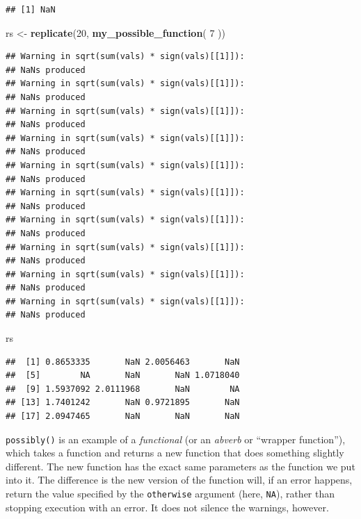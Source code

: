 \documentclass[
]{book}
\newenvironment{Shaded}{\begin{snugshade}}{\end{snugshade}}
\newcommand{\DecValTok}[1]{\textcolor[rgb]{0.00,0.00,0.81}{#1}}
\newcommand{\FunctionTok}[1]{\textcolor[rgb]{0.13,0.29,0.53}{\textbf{#1}}}
\newcommand{\NormalTok}[1]{#1}
\newcommand{\OtherTok}[1]{\textcolor[rgb]{0.56,0.35,0.01}{#1}}
\begin{document}
\begin{verbatim}
## [1] NaN
\end{verbatim}

\begin{Shaded}
\begin{Highlighting}[]
\NormalTok{rs }\OtherTok{\textless{}{-}} \FunctionTok{replicate}\NormalTok{(}\DecValTok{20}\NormalTok{, }\FunctionTok{my\_possible\_function}\NormalTok{( }\DecValTok{7}\NormalTok{ ))}
\end{Highlighting}
\end{Shaded}

\begin{verbatim}
## Warning in sqrt(sum(vals) * sign(vals)[[1]]):
## NaNs produced
## Warning in sqrt(sum(vals) * sign(vals)[[1]]):
## NaNs produced
## Warning in sqrt(sum(vals) * sign(vals)[[1]]):
## NaNs produced
## Warning in sqrt(sum(vals) * sign(vals)[[1]]):
## NaNs produced
## Warning in sqrt(sum(vals) * sign(vals)[[1]]):
## NaNs produced
## Warning in sqrt(sum(vals) * sign(vals)[[1]]):
## NaNs produced
## Warning in sqrt(sum(vals) * sign(vals)[[1]]):
## NaNs produced
## Warning in sqrt(sum(vals) * sign(vals)[[1]]):
## NaNs produced
## Warning in sqrt(sum(vals) * sign(vals)[[1]]):
## NaNs produced
## Warning in sqrt(sum(vals) * sign(vals)[[1]]):
## NaNs produced
\end{verbatim}

\begin{Shaded}
\begin{Highlighting}[]
\NormalTok{rs}
\end{Highlighting}
\end{Shaded}

\begin{verbatim}
##  [1] 0.8653335       NaN 2.0056463       NaN
##  [5]        NA       NaN       NaN 1.0718040
##  [9] 1.5937092 2.0111968       NaN        NA
## [13] 1.7401242       NaN 0.9721895       NaN
## [17] 2.0947465       NaN       NaN       NaN
\end{verbatim}

\texttt{possibly()} is an example of a \emph{functional} (or an \emph{abverb} or ``wrapper function''), which takes a function and returns a new function that does something slightly different.
The new function has the exact same parameters as the function we put into it.
The difference is the new version of the function will, if an error happens, return the value specified by the \texttt{otherwise} argument (here, \texttt{NA}), rather than stopping execution with an error.
It does not silence the warnings, however.
\end{document}
